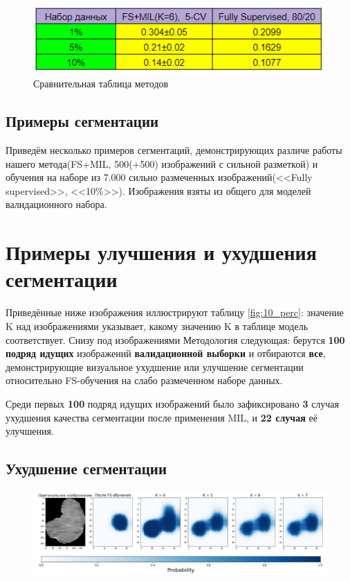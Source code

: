 \begin{figure}[h!] 
  \center
  \includegraphics [scale=1.0] {images/compare_with_fs.png}
  \caption{Сравнительная таблица методов}
  \label{fig:cmp_with_fs}  
\end{figure}
\subsection{Примеры сегментации}

Приведём несколько примеров сегментаций, демонстрирующих различе работы нашего метода(FS+MIL, 500(+500) изображений с сильной разметкой) и обучения на наборе из 7.000 сильно размеченных изображений(<<Fully supervised>>, <<10\%>>). Изображения взяты из общего для моделей валидационного набора.






\section{Примеры улучшения и ухудшения сегментации}

Приведённые ниже изображения иллюстрируют таблицу \ref{fig:10_perc}: значение K над изображениями указывает, какому значению K в таблице модель соответствует. Снизу под изображениями  Методология следующая: берутся {\bf 100 подряд идущих} изображений {\bf валидационной выборки} и отбираются {\bf все}, демонстрирующие визуальное ухудшение или улучшение сегментации относительно FS-обучения на слабо размеченном наборе данных. 

Среди первых {\bf 100} подряд идущих изображений было зафиксировано {\bf 3} случая ухудшения качества сегментации после применения MIL, и {\bf 22 случая} её улучшения. 

\subsection{Ухудшение сегментации}

\begin{figure}[h!] 
  \center
  \includegraphics [scale=0.7] {images/bad_1.png}
\end{figure}

